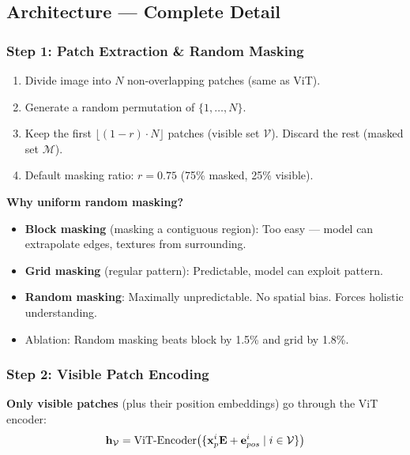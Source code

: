 \subsection{Architecture — Complete Detail}

\subsubsection{Step 1: Patch Extraction \& Random Masking}
\begin{enumerate}
\item Divide image into $N$ non-overlapping patches (same as ViT).
\item Generate a random permutation of $\{1, \ldots, N\}$.
\item Keep the first $\lfloor(1-r) \cdot N\rfloor$ patches (visible set $\mathcal{V}$). Discard the rest (masked set $\mathcal{M}$).
\item Default masking ratio: $r = 0.75$ (75\% masked, 25\% visible).
\end{enumerate}

\textbf{Why uniform random masking?}
\begin{itemize}
\item \textbf{Block masking} (masking a contiguous region): Too easy — model can extrapolate edges, textures from surrounding.
\item \textbf{Grid masking} (regular pattern): Predictable, model can exploit pattern.
\item \textbf{Random masking}: Maximally unpredictable. No spatial bias. Forces holistic understanding.
\item Ablation: Random masking beats block by 1.5\% and grid by 1.8\%.
\end{itemize}

\subsubsection{Step 2: Visible Patch Encoding}
\textbf{Only visible patches} (plus their position embeddings) go through the ViT encoder:
$$\mathbf{h}_\mathcal{V} = \text{ViT-Encoder}\!\left(\{\mathbf{x}_p^i \mathbf{E} + \mathbf{e}_{pos}^i \mid i \in \mathcal{V}\}\right)$$

